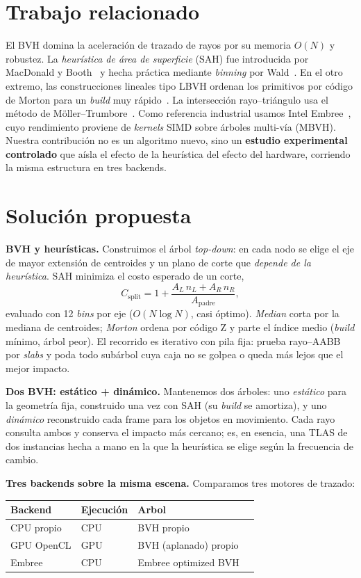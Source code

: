 \documentclass[10pt]{article}
\begin{document}
\section{Trabajo relacionado}
El BVH domina la aceleración de trazado de rayos por su memoria $O(N)$ y
robustez. La \emph{heurística de área de superficie} (SAH) fue introducida por
MacDonald y Booth~\cite{macdonald} y hecha práctica mediante \emph{binning} por
Wald~\cite{wald07}. En el otro extremo, las construcciones lineales tipo LBVH
ordenan los primitivos por código de Morton para un \emph{build} muy
rápido~\cite{lauterbach,karras}. La intersección rayo--triángulo usa el método de
Möller--Trumbore~\cite{moller}. Como referencia industrial usamos Intel
Embree~\cite{embree}, cuyo rendimiento proviene de \emph{kernels} SIMD sobre
árboles multi-vía (MBVH). Nuestra contribución no es un algoritmo nuevo, sino un
\textbf{estudio experimental controlado} que aísla el efecto de la heurística del
efecto del hardware, corriendo la misma estructura en tres backends.

\section{Solución propuesta}
\textbf{BVH y heurísticas.} Construimos el árbol \emph{top-down}: en cada nodo se
elige el eje de mayor extensión de centroides y un plano de corte que
\emph{depende de la heurística}. SAH minimiza el costo esperado de un corte,
\[
C_{\text{split}} = 1 + \frac{A_L\,n_L + A_R\,n_R}{A_{\text{padre}}},
\]
evaluado con 12 \emph{bins} por eje ($O(N\log N)$, casi óptimo). \emph{Median}
corta por la mediana de centroides; \emph{Morton} ordena por código Z y parte el
índice medio (\emph{build} mínimo, árbol peor). El recorrido es iterativo con
pila fija: prueba rayo--AABB por \emph{slabs} y poda todo subárbol cuya caja no
se golpea o queda más lejos que el mejor impacto.

\textbf{Dos BVH: estático + dinámico.} Mantenemos dos árboles: uno \emph{estático}
para la geometría fija, construido una vez con SAH (su \emph{build} se amortiza),
y uno \emph{dinámico} reconstruido cada frame para los objetos en movimiento.
Cada rayo consulta ambos y conserva el impacto más cercano; es, en esencia, una
TLAS de dos instancias hecha a mano en la que la heurística se elige según la
frecuencia de cambio.

\textbf{Tres backends sobre la misma escena.} Comparamos tres motores de trazado:

\begin{center}\small
\setlength{\tabcolsep}{6pt}\renewcommand{\arraystretch}{1.15}
\begin{tabular}{@{}llll@{}}\toprule
Backend     & Ejecución           & Arbol \\\midrule
CPU propio  & CPU                 & BVH propio \\
GPU OpenCL  & GPU                 & BVH (aplanado) propio \\
Embree      & CPU                 & Embree optimized BVH \\
\bottomrule\end{tabular}
\end{center}
\end{document}
